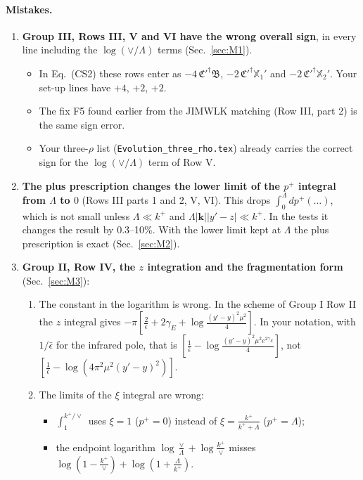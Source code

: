 \documentclass[10pt]{article}
\numberwithin{equation}{section}
\begin{document}
\paragraph{Mistakes.}
\begin{enumerate}
\item[\textbf{M1}] \textbf{Group III, Rows III, V and VI have the wrong overall sign}, in every line including the $\log(\vee/\Lambda)$ terms (Sec.~\ref{sec:M1}).
\begin{itemize}
\item In Eq.~(CS2) these rows enter as $-4\,\mathfrak C'^\dagger\mathfrak B$, $-2\,\mathfrak C'^\dagger\mathbb X_1'$ and $-2\,\mathfrak C'^\dagger\mathbb X_2'$. Your set-up lines have $+4$, $+2$, $+2$.
\item The fix F5 found earlier from the JIMWLK matching (Row III, part 2) is the same sign error.
\item Your three-$\rho$ list (\texttt{Evolution\_three\_rho.tex}) already carries the correct sign for the $\log(\vee/\Lambda)$ term of Row V.
\end{itemize}
\item[\textbf{M2}] \textbf{The plus prescription changes the lower limit of the $p^+$ integral from $\Lambda$ to $0$} (Rows III parts 1 and 2, V, VI). This drops $\int_0^\Lambda dp^+(\dots)$, which is not small unless $\Lambda\ll k^+$ and $\Lambda|\mathbf k||y'-z|\ll k^+$. In the tests it changes the result by 0.3--10\%. With the lower limit kept at $\Lambda$ the plus prescription is exact (Sec.~\ref{sec:M2}).
\item[\textbf{M3}] \textbf{Group II, Row IV, the $z$ integration and the fragmentation form} (Sec.~\ref{sec:M3}):
\begin{enumerate}
\item The constant in the logarithm is wrong. In the scheme of Group I Row II the $z$ integral gives $-\pi[\frac2\epsilon+2\gamma_E+\log\frac{(y'-y)^2\mu^2}{4}]$. In your notation, with $1/\bar\epsilon$ for the infrared pole, that is $[\frac{1}{\bar\epsilon}-\log\frac{(y'-y)^2\mu^2e^{2\gamma_E}}{4}]$, not $[\frac{1}{\bar\epsilon}-\log(4\pi^2\mu^2(y'-y)^2)]$.
\item The limits of the $\xi$ integral are wrong:
\begin{itemize}
\item $\int_1^{k^+/\vee}$ uses $\xi=1$ ($p^+=0$) instead of $\xi=\frac{k^+}{k^++\Lambda}$ ($p^+=\Lambda$);
\item the endpoint logarithm $\log\frac{\vee}{\Lambda}+\log\frac{k^+}{\vee}$ misses $\log(1-\frac{k^+}{\vee})+\log(1+\frac{\Lambda}{k^+})$.

\end{itemize}
\end{enumerate}
\end{enumerate}
\end{document}
